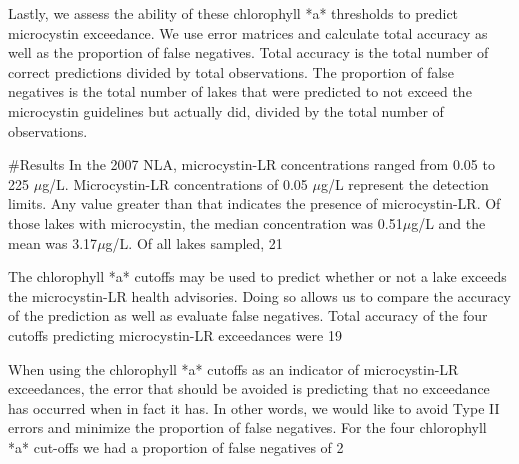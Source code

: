 Lastly, we assess the ability of these chlorophyll *a* thresholds to predict microcystin exceedance.  We use error matrices and calculate total accuracy as well as the proportion of false negatives.  Total accuracy is the total number of correct predictions divided by total observations.  The proportion of false negatives is the total number of lakes that were predicted to not exceed the microcystin guidelines but actually did, divided by the total number of observations. 


#Results
In the 2007 NLA, microcystin-LR concentrations ranged from 0.05 to 225 $\mu$g/L.  Microcystin-LR concentrations of 0.05 $\mu$g/L represent the detection limits.  Any value greater than that indicates the presence of microcystin-LR.  Of those lakes with microcystin, the median concentration was 0.51$\mu$g/L and the mean was 3.17$\mu$g/L.  Of all lakes sampled, 21%

The chlorophyll *a* cutoffs may be used to predict whether or not a lake exceeds the microcystin-LR health advisories.  Doing so allows us to compare the accuracy of the prediction as well as evaluate false negatives.  Total accuracy of the four cutoffs predicting microcystin-LR exceedances were 19%

When using the chlorophyll *a* cutoffs as an indicator of microcystin-LR exceedances, the error that should be avoided is predicting that no exceedance has occurred when in fact it has.  In other words, we would like to avoid Type II errors and minimize the proportion of false negatives.  For the four chlorophyll *a* cut-offs we had a proportion of false negatives of 2%

